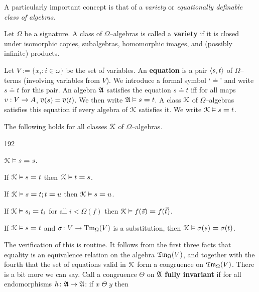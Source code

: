 A particularly important concept is that of a {\it variety}
or {\it equationally definable class of algebras}.
\begin{defn}
Let $\Omega$ be a signature. A class of $\Omega$--algebras is
called a \textbf{variety} if it is closed under isomorphic copies,
subalgebras, homomorphic images, and (possibly infinite)
products.
\end{defn}
Let $V := \{x_i : i \in \omega\}$ be the set of variables.
An \textbf{equation} is a pair $\langle s, t\rangle$ of $\Omega$--terms
(involving variables from $V$). We introduce a formal symbol 
`$\boldsymbol{\doteq}$' and write $s \boldsymbol{\doteq} t$ 
for this pair. An algebra $\mathfrak{A}$ satisfies the equation 
$s \boldsymbol{\doteq} t$ iff for all maps $v : V \rightarrow A$, 
$\overline{v}(s) = \overline{v}(t)$. We then write 
$\mathfrak{A} \vDash s \boldsymbol{=} t$. A class $\mathcal{K}$ of 
$\Omega$--algebras satisfies this equation if every algebra of 
$\mathcal{K}$ satisfies it.  We write $\mathcal{K} \vDash s \boldsymbol{=} t$.
\begin{prop}
\label{prop:eqcalc}
The following holds for all classes $\mathcal{K}$ of $\Omega$--algebras.
\begin{dingautolist}{192}
\item $\mathcal{K} \vDash s \boldsymbol{=} s$.
\item If $\mathcal{K} \vDash s \boldsymbol{=} t$ then 
$\mathcal{K} \vDash t \boldsymbol{=} s$.
\item If $\mathcal{K} \vDash s \boldsymbol{=} t; t \boldsymbol{=} u$ 
	then $\mathcal{K} \vDash s \boldsymbol{=} u$.
\item If $\mathcal{K} \vDash s_i \boldsymbol{=} t_i$ for all $i < \Omega(f)$ 
	then $\mathcal{K} \vDash f(\vec{s}) \boldsymbol{=} f(\vec{t})$.
\item If $\mathcal{K} \vDash s \boldsymbol{=} t$ and $\sigma \colon V \rightarrow
    \operatorname{Tm}_{\Omega}(V)$ is a substitution, then
    $\mathcal{K} \vDash \sigma(s) \boldsymbol{=} \sigma(t)$.
\end{dingautolist}
\end{prop}
The verification of this is routine. It follows from the first three
facts that equality is an equivalence relation on the algebra
$\mathfrak{Tm}_{\Omega}(V)$, and together with the fourth that
the set of equations valid in $\mathcal{K}$ form a congruence
on $\mathfrak{Tm}_{\Omega}(V)$. There is a bit more we can say. Call
a congruence $\Theta$ on $\mathfrak{A}$ \textbf{fully invariant} if for all
endomorphisms $h \colon \mathfrak{A} \rightarrow \mathfrak{A}$: if $x \; \Theta\; y$ then

